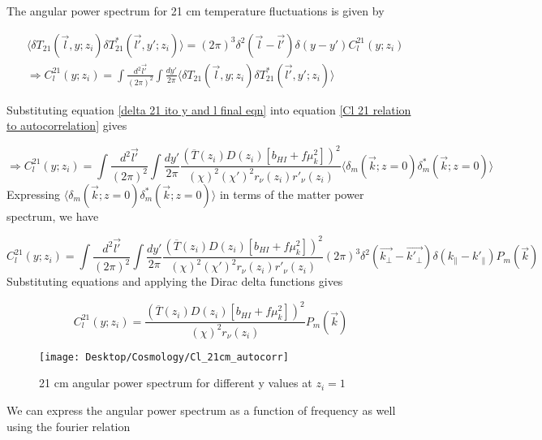 \documentclass[12pt]{article}
\begin{document}
The angular power spectrum for 21 cm temperature fluctuations is given by 

\begin{equation}\label{Cl 21 relation to autocorrelation}
\begin{aligned}
&\langle  \delta T_{21}(\vec{l},y;z_i) \delta T_{21}^*(\vec{l'},y';z_i)\rangle  =(2 \pi)^3\delta^2(\vec{l}-\vec{l'})\delta(y-y')C_l^{21}(y;z_i)
\\&
\Rightarrow C_l^{21}(y;z_i)=\int \frac{d^2\vec{l'}}{(2\pi)^2} \int \frac{dy'}{2\pi}\langle  \delta T_{21}(\vec{l},y;z_i) \delta T_{21}^*(\vec{l'},y';z_i)\rangle  
\end{aligned}
\end{equation}

Substituting equation \ref{delta 21 ito y and l final eqn} into equation \ref{Cl 21 relation to autocorrelation} gives

\begin{equation}
\Rightarrow C_l^{21}(y;z_i)=\int \frac{d^2\vec{l'}}{(2\pi)^2}\int \frac{dy'}{2\pi}\frac{(\overline{T}(z_i)D(z_i)[b_{HI}+f\mu_k^2])^2}{(\chi )^2 (\chi' )^2 r_{\nu}(z_i) r'_{\nu}(z_i)}\langle  \delta_m(\vec{k};z=0)\delta_m^*(\vec{k};z=0)\rangle  
\end{equation}
Expressing $\langle  \delta_m(\vec{k};z=0)\delta_m^*(\vec{k};z=0)\rangle  $ in terms of the matter power spectrum, we have

\begin{equation}
C_l^{21}(y;z_i)=\int \frac{d^2\vec{l'}}{(2\pi)^2}\int \frac{dy'}{2\pi}\frac{(\overline{T}(z_i)D(z_i)[b_{HI}+f\mu_k^2])^2}{(\chi )^2 (\chi' )^2 r_{\nu}(z_i) r'_{\nu}(z_i)}(2\pi)^3
\delta^2(\vec{k_{\bot}}-\vec{k'_\bot})\delta(k_{\parallel}-k'_\parallel)P_m(\vec{k})
\end{equation}
Substituting equations and applying the Dirac delta functions gives

\begin{equation}
C_l^{21}(y;z_i)=\frac{(\overline{T}(z_i)D(z_i)[b_{HI}+f\mu_k^2])^2}{(\chi )^2 r_{\nu}(z_i)}P_m(\vec{k})
\end{equation}

\begin{figure}[h!]
	\centering
	\texttt{[image: Desktop/Cosmology/Cl\_21cm\_autocorr]}
	\caption{21 cm angular power spectrum for different y values at $z_i=1$}
	\label{fig:cl21cmautocorr}
\end{figure}


We can express the angular power spectrum as a function of frequency as well using the fourier relation
\end{document}
